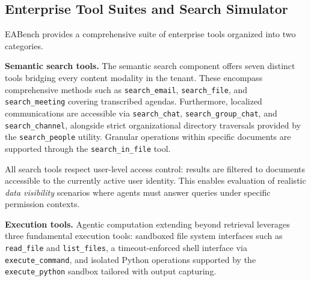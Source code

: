 \documentclass[journal,dvipsnames]{acmart}
\begin{document}
\subsection{Enterprise Tool Suites and Search Simulator}
\label{sec:tools}

EABench provides a comprehensive suite of enterprise tools organized into two
categories.

\textbf{Semantic search tools.}
The semantic search component offers seven distinct tools bridging every content modality in the tenant. These encompass comprehensive methods such as \texttt{search\_email}, \texttt{search\_file}, and \texttt{search\_meeting} covering transcribed agendas. Furthermore, localized communications are accessible via \texttt{search\_chat}, \texttt{search\_group\_chat}, and \texttt{search\_channel}, alongside strict organizational directory traversals provided by the \texttt{search\_people} utility. Granular operations within specific documents are supported through the \texttt{search\_in\_file} tool.

All search tools respect user-level access control: results are filtered to
documents accessible to the currently active user identity.  This enables
evaluation of realistic \emph{data visibility} scenarios where agents must
answer queries under specific permission contexts.

\textbf{Execution tools.}
Agentic computation extending beyond retrieval leverages three fundamental execution tools: sandboxed file system interfaces such as \texttt{read\_file} and \texttt{list\_files}, a timeout-enforced shell interface via \texttt{execute\_command}, and isolated Python operations supported by the \texttt{execute\_python} sandbox tailored with output capturing.
\end{document}
